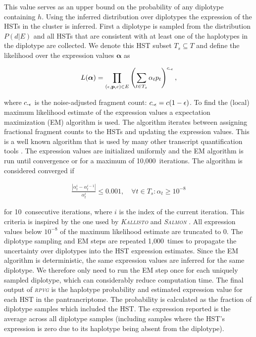 \documentclass[11pt]{ucthesis}
\newcommand{\tool}[1]{\emph{\textsc{#1}}}
\begin{document}
\noindent This value serves as an upper bound on the probability of any diplotype containing $h$. 
\newline 
\newline
Using the inferred distribution over diplotypes the expression of the HSTs in the cluster is inferred. First a diplotype is sampled from the distribution $P(d|E)$ and all HSTs that are consistent with at least one of the haplotypes in the diplotype are collected. We denote this HST subset ${T_s\subseteq T}$ and define the likelihood over the expression values $\boldsymbol{\alpha}$ as 

\begin{align}
    L(\boldsymbol{\alpha})=\prod_{\left(\epsilon, \textbf{p}, c\right) \in E}\left(\sum_{t\in T_s}\alpha_t p_t\right)^{c_{{\text -}\epsilon}},
\end{align}

\noindent where $c_{{\text -}\epsilon}$ is the noise-adjusted fragment count: ${c_{{\text -}\epsilon}=c(1-\epsilon)}$. To find the (local) maximum likelihood estimate of the expression values a expectation maximization (EM) algorithm is used. The algorithm iterates between assigning fractional fragment counts to the HSTs and updating the expression values. This is a well known algorithm that is used by many other transcript quantification tools \cite{li2011rsem,nicolae2011estimation,patro2017salmon,bray2016near}. The expression values are initialized uniformly and the EM algorithm is run until convergence or for a maximum of 10,000~iterations. The algorithm is considered converged if 

\begin{align}
    \frac{\left|\alpha_t^{i}-\alpha_t^{i-1}\right|}{\alpha_t^{i}}\leq0.001,\quad\forall t\in T_s:\alpha_t\geq10^{-8}
\end{align}

\noindent for 10~consecutive iterations, where $i$ is the index of the current iteration. This criteria is inspired by the one used by \tool{Kallisto} \cite{bray2016near} and \tool{Salmon} \cite{patro2017salmon}. All expression values below $10^{-8}$ of the maximum likelihood estimate are truncated to 0. 
The diplotype sampling and EM steps are repeated 1,000~times to propagate the uncertainty over diplotypes into the HST expression estimates. Since the EM algorithm is deterministic, the same expression values are inferred for the same diplotype. We therefore only need to run the EM step once for each uniquely sampled diplotype, which can considerably reduce computation time. 
\newline 
\newline
The final output of \tool{rpvg} is the haplotype probability and estimated expression value for each HST in the pantrancriptome. The probability is calculated as the fraction of diplotype samples which included the HST. The expression reported is the average across all diplotype samples (including samples where the HST's expression is zero due to its haplotype being absent from the diplotype). 
\end{document}
